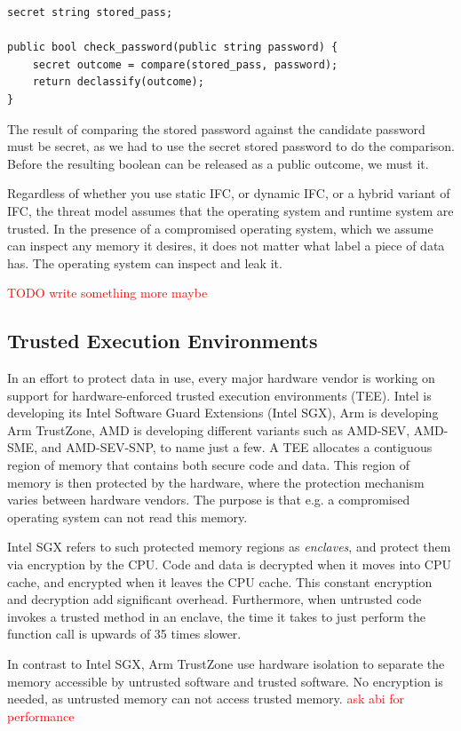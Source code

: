 \begin{verbatim}
secret string stored_pass;

public bool check_password(public string password) {
    secret outcome = compare(stored_pass, password);
    return declassify(outcome);
}
\end{verbatim}

The result of comparing the stored password against the candidate password must be secret, as we had to use the secret stored
password to do the comparison. Before the resulting boolean can be released as a public outcome, we must
 it.

Regardless of whether you use static IFC, or dynamic IFC, or a hybrid variant of IFC, the threat model assumes that the
operating system and runtime system are trusted. In the presence of a compromised operating system, which we assume can
inspect any memory it desires, it does not matter what label a piece of data has. The operating system can inspect and
leak it.

\textcolor{red}{TODO write something more maybe}

\subsection{Trusted Execution Environments}

In an effort to protect data in use, every major hardware vendor is working on support for hardware-enforced trusted
execution environments (TEE). Intel is developing its Intel Software Guard Extensions (Intel SGX)\cite{intelsgx}, Arm is
developing Arm TrustZone\cite{armtz}, AMD is developing different variants such as AMD-SEV\cite{amdsev}, AMD-SME, and
AMD-SEV-SNP, to name just a few. A TEE allocates a contiguous region of memory that contains both secure code and data.
This region of memory is then protected by the hardware, where the protection mechanism varies between hardware vendors.
The purpose is that e.g. a compromised operating system can not read this memory.

Intel SGX refers to such protected memory regions as \textit{enclaves}, and protect them via encryption by the CPU. Code and
data is decrypted when it moves into CPU cache, and encrypted when it leaves the CPU cache. This constant encryption
and decryption add significant overhead. Furthermore, when untrusted code invokes a trusted method in an enclave, the time it takes
to just perform the function call is upwards of 35 times slower.

In contrast to Intel SGX, Arm TrustZone use hardware isolation to separate the memory accessible by untrusted software and
trusted software. No encryption is needed, as untrusted memory can not access trusted memory. \textcolor{red}{ask abi for performance}

